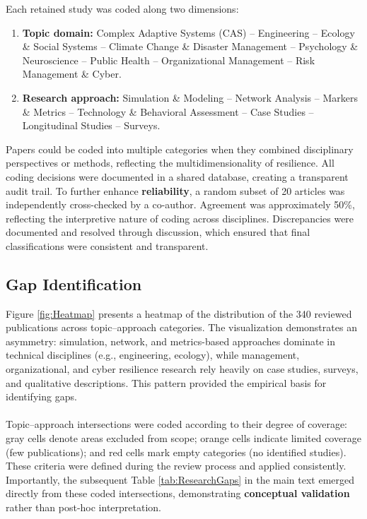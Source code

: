 Each retained study was coded along two dimensions:  

\begin{enumerate}
    \item \textbf{Topic domain:} Complex Adaptive Systems (CAS) -- Engineering -- Ecology \& Social Systems -- Climate Change \& Disaster Management -- Psychology \& Neuroscience -- Public Health -- Organizational Management -- Risk Management \& Cyber.  
    \item \textbf{Research approach:} Simulation \& Modeling -- Network Analysis -- Markers \& Metrics -- Technology \& Behavioral Assessment -- Case Studies -- Longitudinal Studies -- Surveys.\\  
\end{enumerate}

Papers could be coded into multiple categories when they combined disciplinary perspectives or methods, reflecting the multidimensionality of resilience. All coding decisions were documented in a shared database, creating a transparent audit trail. To further enhance \textbf{reliability}, a random subset of 20 articles was independently cross-checked by a co-author. Agreement was approximately 50\%, reflecting the interpretive nature of coding across disciplines. Discrepancies were documented and resolved through discussion, which ensured that final classifications were consistent and transparent.  

\subsection{Gap Identification}

Figure \ref{fig:Heatmap} presents a heatmap of the distribution of the 340 reviewed publications across topic–approach categories. The visualization demonstrates an asymmetry: simulation, network, and metrics-based approaches dominate in technical disciplines (e.g., engineering, ecology), while management, organizational, and cyber resilience research rely heavily on case studies, surveys, and qualitative descriptions. This pattern provided the empirical basis for identifying gaps.\\  
\\
Topic–approach intersections were coded according to their degree of coverage: gray cells denote areas excluded from scope; orange cells indicate limited coverage (few publications); and red cells mark empty categories (no identified studies). These criteria were defined during the review process and applied consistently. Importantly, the subsequent Table \ref{tab:ResearchGaps} in the main text emerged directly from these coded intersections, demonstrating \textbf{conceptual validation} rather than post-hoc interpretation. 

